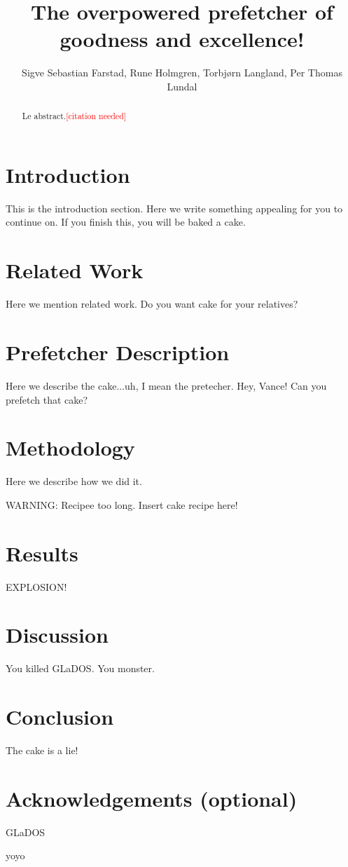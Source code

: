 \documentclass[a4paper]{IEEEtran}
\title{The overpowered prefetcher of goodness and excellence!}
\author{
    Sigve Sebastian Farstad,
    Rune Holmgren,
    Torbjørn Langland,
    Per Thomas Lundal
}
\newcommand\cn{\textcolor{red}{[citation needed]}}
\begin{document}
\maketitle

\begin{abstract}
    Le abstract.\cn
\end{abstract}

\section{Introduction}
This is the introduction section. Here we write something appealing for you to continue on. If you finish this, you will be baked a cake.
\section{Related Work}
Here we mention related work. Do you want cake for your relatives?
\section{Prefetcher Description}
Here we describe the cake...uh, I mean the pretecher. Hey, Vance! Can you prefetch that cake?
\section{Methodology}
Here we describe how we did it.

WARNING: Recipee too long. Insert cake recipe here!
\section{Results}
EXPLOSION!
\section{Discussion}
You killed GLaDOS.
You monster.
\section{Conclusion}
The cake is a lie!
\section{Acknowledgements (optional)}
GLaDOS

yoyo \cite{assignment-text}



\nocite{*}
\end{document}
